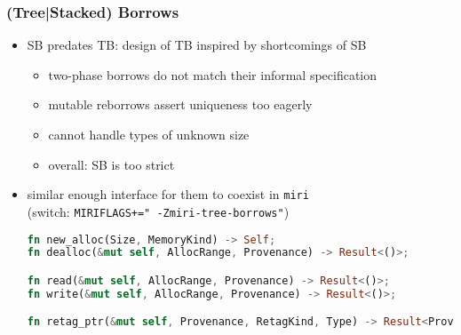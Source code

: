 \begin{frame}[fragile]
    \frametitle{(Tree|Stacked) Borrows}
    \begin{itemize}
        \item SB predates TB: design of TB inspired by shortcomings of SB
            \begin{itemize}
                \item two-phase borrows do not match their informal specification
                \item mutable reborrows assert uniqueness too eagerly
                \item cannot handle types of unknown size
                \item overall: SB is too strict
            \end{itemize}
        \item similar enough interface for them to coexist in \texttt{miri}\\
            (switch: \texttt{MIRIFLAGS+=" -Zmiri-tree-borrows"})
            \begin{minipage}{0.9\textwidth}
            \begin{block}{}
                \begin{lstlisting}[language=rust, basicstyle=\ttfamily\fontsize{7}{8}\selectfont]
fn new_alloc(Size, MemoryKind) -> Self;
fn dealloc(&mut self, AllocRange, Provenance) -> Result<()>;

fn read(&mut self, AllocRange, Provenance) -> Result<()>;
fn write(&mut self, AllocRange, Provenance) -> Result<()>;

fn retag_ptr(&mut self, Provenance, RetagKind, Type) -> Result<Provenance>;
                \end{lstlisting}
            \end{block}
            \end{minipage}
    \end{itemize}
\end{frame}


